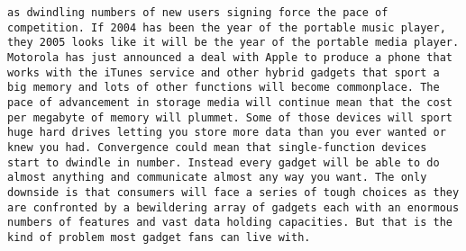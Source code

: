 \documentclass[11pt]{article}
\begin{document}
\begin{Verbatim}[commandchars=\\\{\}]
as dwindling numbers of new users signing force the pace of competition. If 2004 has been the year of the portable music player, they 2005 looks like it will be the year of the portable media player. Motorola has just announced a deal with Apple to produce a phone that works with the iTunes service and other hybrid gadgets that sport a big memory and lots of other functions will become commonplace. The pace of advancement in storage media will continue mean that the cost per megabyte of memory will plummet. Some of those devices will sport huge hard drives letting you store more data than you ever wanted or knew you had. Convergence could mean that single-function devices start to dwindle in number. Instead every gadget will be able to do almost anything and communicate almost any way you want. The only downside is that consumers will face a series of tough choices as they are confronted by a bewildering array of gadgets each with an enormous numbers of features and vast data holding capacities. But that is the kind of problem most gadget fans can live with.                                                                                                                                                                                                                                                                                                                                                                                                                                                                                                                                                                                                                                                                                                                                                                           

\end{Verbatim}
\end{document}
